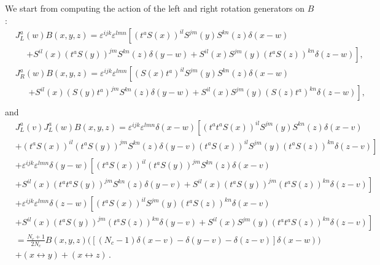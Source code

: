 \documentclass[11pt,a4paper]{article}
\begin{document}
We start from computing the action of the left and right rotation generators on $B$:
\begin{equation}\begin{split}
&J_{L}^{a}(w)B(x,y,z)=\varepsilon^{ijk}\varepsilon^{lmn}\left[(t^{a}S(x))^{il}S^{jm}(y)S^{kn}(z)\delta(x-w)\right. \\
&\ \ \ \ \ \ \left.+S^{il}(x)(t^{a}S(y))^{jm}S^{kn}(z)\delta(y-w)
 +S^{il}(x)S^{jm}(y)(t^{a}S(z))^{kn}\delta(z-w)\right], \\
&J_{R}^{a}(w)B(x,y,z)=\varepsilon^{ijk}\varepsilon^{lmn}\left[(S(x)t^{a})^{il}S^{jm}(y)S^{kn}(z)\delta(x-w)\right. \\
&\ \ \ \ \ \ \ \left.+S^{il}(x)(S(y)t^{a})^{jm}S^{kn}(z)\delta(y-w)+S^{il}(x)S^{jm}(y)(S(z)t^{a})^{kn}\delta(z-w)\right],\\
\end{split}\end{equation}
and
\begin{equation}\begin{split}
&J_{L}^{a}(v)J_{L}^{a}(w)B(x,y,z)=\varepsilon^{ijk}\varepsilon^{lmn}\delta(x-w)\left[(t^{a}t^{a}S(x))^{il}S^{jm}(y)S^{kn}(z)\delta(x-v)\right.\\
&\left.+(t^{a}S(x))^{il}(t^{a}S(y))^{jm}S^{kn}(z)\delta(y-v)(t^{a}S(x))^{il}S^{jm}(y)(t^{a}S(z))^{kn}\delta(z-v)\right]\\
&+\varepsilon^{ijk}\varepsilon^{lmn}\delta(y-w)\left[(t^{a}S(x))^{il}(t^{a}S(y))^{jm}S^{kn}(z)\delta(x-v)\right.\\
&+\left.S^{il}(x)(t^{a}t^{a}S(y))^{jm}S^{kn}(z)\delta(y-v)+S^{il}(x)(t^{a}S(y))^{jm}(t^{a}S(z))^{kn}\delta(z-v)\right]\\
&+\varepsilon^{ijk}\varepsilon^{lmn}\delta(z-w)\left[(t^{a}S(x))^{il}S^{jm}(y)(t^{a}S(z))^{kn}\delta(x-v)\right.\\
&+\left.S^{il}(x)(t^{a}S(y))^{jm}(t^{a}S(z))^{kn}\delta(y-v)+S^{il}(x)S^{jm}(y)(t^{a}t^{a}S(z))^{kn}\delta(z-v)\right]\\
&=\frac{N_{c}+1}{2N_{c}}B(x,y,z)\Big(\left[(N_{c}-1)\delta(x-v)-\delta(y-v)-\delta(z-v)\right]\delta(x-w)\Big)\\ 
&+\left(x\leftrightarrow y\right)+\left(x\leftrightarrow z\right)\,.\\
\end{split}\end{equation}
\end{document}
